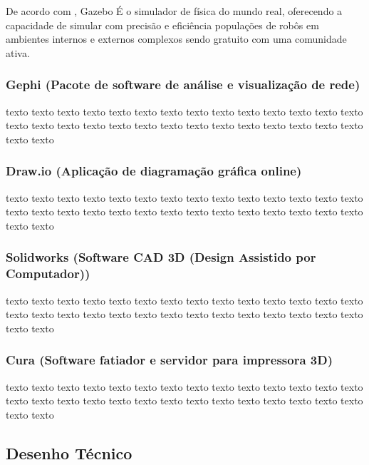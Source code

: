 De acordo com \cite{gazebo}, Gazebo É o simulador de física do mundo real, oferecendo a capacidade de simular com precisão e eficiência populações de robôs em ambientes internos e externos complexos sendo gratuito com uma comunidade ativa.

\subsubsection{Gephi (Pacote de software de análise e visualização de rede)}
\label{sec:gephi}

texto texto texto texto texto texto texto texto texto texto
texto texto texto texto texto texto texto texto texto texto
texto texto texto texto texto texto texto texto texto texto

\subsubsection{Draw.io (Aplicação de diagramação gráfica online)}
\label{sec:drawio}

texto texto texto texto texto texto texto texto texto texto
texto texto texto texto texto texto texto texto texto texto
texto texto texto texto texto texto texto texto texto texto

\subsubsection{Solidworks (Software CAD 3D (Design Assistido por Computador))}
\label{sec:solidwoks}

texto texto texto texto texto texto texto texto texto texto
texto texto texto texto texto texto texto texto texto texto
texto texto texto texto texto texto texto texto texto texto

\subsubsection{Cura (Software fatiador e servidor para impressora 3D)}
\label{sec:cura}

texto texto texto texto texto texto texto texto texto texto
texto texto texto texto texto texto texto texto texto texto
texto texto texto texto texto texto texto texto texto texto

\subsection{Desenho Técnico}
\label{sec:desenhotecnico}

